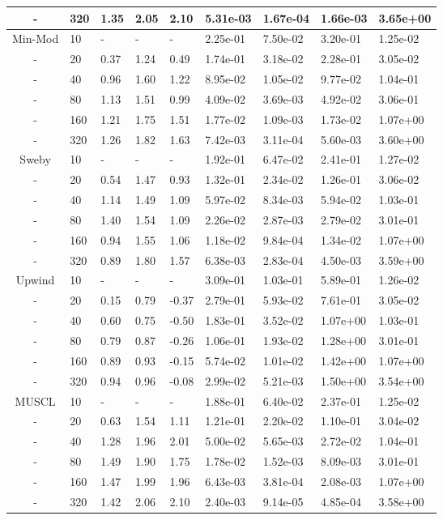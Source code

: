 \begin{table}[p]
{\begin{tabular}{cllllllll}
     - & 320 & 1.35 & 2.05 & 2.10 & 5.31e-03 & 1.67e-04 &1.66e-03 &3.65e+00 \\ 
   \hline
        Min-Mod &  10 & - & - & - & 2.25e-01 & 7.50e-02 &3.20e-01 &1.25e-02 \\ 
        - &  20 & 0.37 & 1.24 & 0.49 & 1.74e-01 & 3.18e-02 &2.28e-01 &3.05e-02 \\ 
        - &  40 & 0.96 & 1.60 & 1.22 & 8.95e-02 & 1.05e-02 &9.77e-02 &1.04e-01 \\ 
        - &  80 & 1.13 & 1.51 & 0.99 & 4.09e-02 & 3.69e-03 &4.92e-02 &3.06e-01 \\ 
        - & 160 & 1.21 & 1.75 & 1.51 & 1.77e-02 & 1.09e-03 &1.73e-02 &1.07e+00 \\ 
        - & 320 & 1.26 & 1.82 & 1.63 & 7.42e-03 & 3.11e-04 &5.60e-03 &3.60e+00 \\ 
   \hline
          Sweby &  10 & - & - & - & 1.92e-01 & 6.47e-02 &2.41e-01 &1.27e-02 \\ 
          - &  20 & 0.54 & 1.47 & 0.93 & 1.32e-01 & 2.34e-02 &1.26e-01 &3.06e-02 \\ 
          - &  40 & 1.14 & 1.49 & 1.09 & 5.97e-02 & 8.34e-03 &5.94e-02 &1.03e-01 \\ 
          - &  80 & 1.40 & 1.54 & 1.09 & 2.26e-02 & 2.87e-03 &2.79e-02 &3.01e-01 \\ 
          - & 160 & 0.94 & 1.55 & 1.06 & 1.18e-02 & 9.84e-04 &1.34e-02 &1.07e+00 \\ 
          - & 320 & 0.89 & 1.80 & 1.57 & 6.38e-03 & 2.83e-04 &4.50e-03 &3.59e+00 \\ 
   \hline
         Upwind &  10 & - & - & - & 3.09e-01 & 1.03e-01 &5.89e-01 &1.26e-02 \\ 
         - &  20 & 0.15 & 0.79 & -0.37& 2.79e-01 & 5.93e-02 &7.61e-01 &3.05e-02 \\ 
         - &  40 & 0.60 & 0.75 & -0.50& 1.83e-01 & 3.52e-02 &1.07e+00 &1.03e-01 \\ 
         - &  80 & 0.79 & 0.87 & -0.26& 1.06e-01 & 1.93e-02 &1.28e+00 &3.01e-01 \\ 
         - & 160 & 0.89 & 0.93 & -0.15& 5.74e-02 & 1.01e-02 &1.42e+00 &1.07e+00 \\ 
         - & 320 & 0.94 & 0.96 & -0.08& 2.99e-02 & 5.21e-03 &1.50e+00 &3.54e+00 \\ 
   \hline
          MUSCL &  10 & - & - & - & 1.88e-01 & 6.40e-02 &2.37e-01 &1.25e-02 \\ 
          - &  20 & 0.63 & 1.54 & 1.11 & 1.21e-01 & 2.20e-02 &1.10e-01 &3.04e-02 \\ 
          - &  40 & 1.28 & 1.96 & 2.01 & 5.00e-02 & 5.65e-03 &2.72e-02 &1.04e-01 \\ 
          - &  80 & 1.49 & 1.90 & 1.75 & 1.78e-02 & 1.52e-03 &8.09e-03 &3.01e-01 \\ 
          - & 160 & 1.47 & 1.99 & 1.96 & 6.43e-03 & 3.81e-04 &2.08e-03 &1.07e+00 \\ 
          - & 320 & 1.42 & 2.06 & 2.10 & 2.40e-03 & 9.14e-05 &4.85e-04 &3.58e+00 \\ 
   \hline
   \end{tabular}
   }
\end{table}

